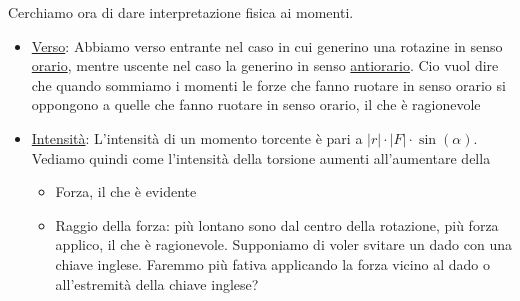 \vskip3mm
Cerchiamo ora di dare interpretazione fisica ai momenti.
\begin{itemize}
	\item \underline{Verso}:
	      Abbiamo verso entrante nel caso in cui generino una rotazine in senso \underline{orario}, mentre uscente nel caso la generino in senso \underline{antiorario}. Cio vuol dire che quando sommiamo i momenti le forze che fanno ruotare in senso orario si oppongono a quelle che fanno ruotare in senso orario, il che è ragionevole
	\item \underline{Intensità}:
	      L'intensità di un momento torcente è pari a $ \left|r\right| \cdot \left|F\right| \cdot \sin \left(\alpha \right) $. Vediamo quindi come l'intensità della torsione aumenti all'aumentare della
	      \begin{itemize}
		      \item Forza, il che è evidente
		      \item Raggio della forza: più lontano sono dal centro della rotazione, più forza applico, il che è ragionevole. Supponiamo di voler svitare un dado con una chiave inglese. Faremmo più fativa applicando la forza vicino al dado o all'estremità della chiave inglese?
		            \begin{center}
		            \end{center}
	      \end{itemize}
\end{itemize}

\usetikzlibrary{calc}
\usetikzlibrary{intersections}

